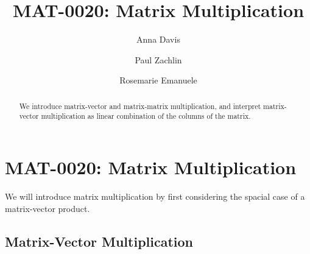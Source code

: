 \documentclass{ximera}
\author{Anna Davis \and Paul Zachlin \and Rosemarie Emanuele} \title{MAT-0020:  Matrix Multiplication} \license{CC-BY 4.0}
\begin{document}
\begin{abstract}
  We introduce matrix-vector and matrix-matrix multiplication, and interpret matrix-vector multiplication as linear combination of the columns of the matrix.
\end{abstract}
\maketitle

\section*{MAT-0020:  Matrix Multiplication}

We will introduce matrix multiplication by first considering the spacial case of a matrix-vector product.

\subsection*{Matrix-Vector Multiplication}
\end{document}
